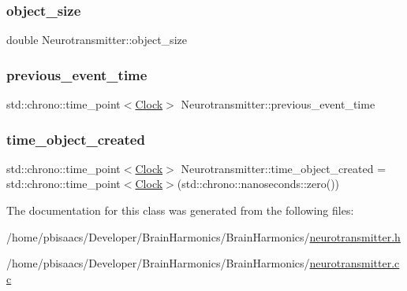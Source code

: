 \subsubsection{\texorpdfstring{object\+\_\+size}{object\_size}}
{\footnotesize\ttfamily double Neurotransmitter\+::object\+\_\+size\hspace{0.3cm}{\ttfamily [private]}}

\mbox{\label{classNeurotransmitter_a47efa9a5481fae796df7f1020a15e2f2}} 
\subsubsection{\texorpdfstring{previous\+\_\+event\+\_\+time}{previous\_event\_time}}
{\footnotesize\ttfamily std\+::chrono\+::time\+\_\+point$<$\mbox{\hyperlink{universe_8h_a0ef8d951d1ca5ab3cfaf7ab4c7a6fd80}{Clock}}$>$ Neurotransmitter\+::previous\+\_\+event\+\_\+time\hspace{0.3cm}{\ttfamily [private]}}

\mbox{\label{classNeurotransmitter_acad5444f7486ee9c2d3bff1b6b3f59ad}} 
\subsubsection{\texorpdfstring{time\+\_\+object\+\_\+created}{time\_object\_created}}
{\footnotesize\ttfamily std\+::chrono\+::time\+\_\+point$<$\mbox{\hyperlink{universe_8h_a0ef8d951d1ca5ab3cfaf7ab4c7a6fd80}{Clock}}$>$ Neurotransmitter\+::time\+\_\+object\+\_\+created = std\+::chrono\+::time\+\_\+point$<$\mbox{\hyperlink{universe_8h_a0ef8d951d1ca5ab3cfaf7ab4c7a6fd80}{Clock}}$>$(std\+::chrono\+::nanoseconds\+::zero())\hspace{0.3cm}{\ttfamily [private]}}



The documentation for this class was generated from the following files\+:\begin{DoxyCompactItemize}
\item 
/home/pbisaacs/\+Developer/\+Brain\+Harmonics/\+Brain\+Harmonics/\mbox{\hyperlink{neurotransmitter_8h}{neurotransmitter.\+h}}\item 
/home/pbisaacs/\+Developer/\+Brain\+Harmonics/\+Brain\+Harmonics/\mbox{\hyperlink{neurotransmitter_8cc}{neurotransmitter.\+cc}}\end{DoxyCompactItemize}
